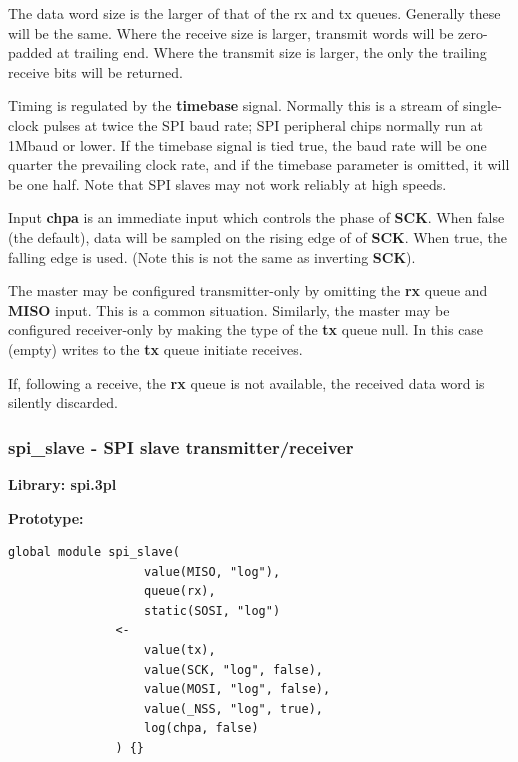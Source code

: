             The data word size is the larger of that of the rx and tx queues.
            Generally these will be the same. Where the receive size is larger, 
            transmit words will be zero-padded at trailing end. Where the transmit
            size is larger, the only the trailing receive bits will be returned.

            Timing is regulated by the {\bf timebase} signal. Normally this is a stream
            of single-clock pulses at twice the SPI baud rate; SPI peripheral chips
            normally run at 1Mbaud or lower. If the timebase signal is tied true,
            the baud rate will be one quarter the prevailing clock rate, and if the
            timebase parameter is omitted, it will be one half. Note that SPI
            slaves may not work reliably at high speeds.

            Input {\bf chpa} is an immediate input which controls the phase of {\bf
            SCK}. When false (the default), data will be sampled on the rising edge
            of of {\bf SCK}. When true, the falling edge is used. (Note this is not
            the same as inverting {\bf SCK}).

            The master may be configured transmitter-only by omitting the {\bf rx}
            queue and {\bf MISO} input. This is a common situation. Similarly, the 
            master may be configured receiver-only by making the type of the {\bf
            tx} queue null. In this case (empty) writes to the {\bf tx} queue initiate
            receives.

            If, following a receive, the {\bf rx} queue is not available, the received
            data word is silently discarded.



        \subsubsection{spi\_slave - SPI slave transmitter/receiver}\label{sec:lmspislave}

            {\bf Library: spi.3pl}

            {\bf Prototype:} \\
            \vsp
            \begin{lstlisting}[gobble=12, language=threepl]
               global module spi_slave(
                   value(MISO, "log"),
                   queue(rx),
                   static(SOSI, "log")
               <-
                   value(tx),
                   value(SCK, "log", false),
                   value(MOSI, "log", false),
                   value(_NSS, "log", true),
                   log(chpa, false)
               ) {}
            \end{lstlisting}


